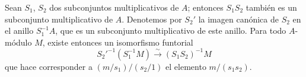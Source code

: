 \begin{env}[1.4.6]
\label{0.1.4.6-fr}
Sean $S_1$, $S_2$ dos subconjuntos multiplicativos de $A$; entonces $S_1S_2$ también es un subconjunto multiplicativo de $A$.
Denotemos por $S_2'$ la imagen canónica de $S_2$ en el anillo $S_1^{-1}A$, que es un subconjunto multiplicativo de este anillo.
Para todo $A$-módulo $M$, existe entonces un isomorfismo funtorial
\[
  S_2'^{-1}(S_1^{-1}M)\xrightarrow{\sim}(S_1S_2)^{-1}M
\]
que hace corresponder a $(m/s_1)/(s_2/1)$ el elemento $m/(s_1s_2)$.
\end{env}
